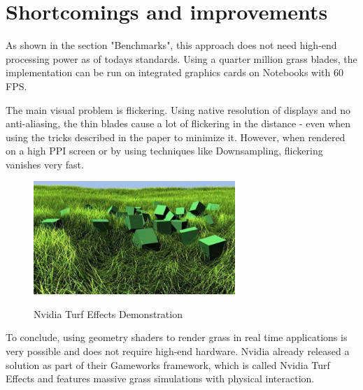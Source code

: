 \documentclass[conference]{acmsiggraph}
\begin{document}
\section{Shortcomings and improvements}

As shown in the section "Benchmarks", this approach does not need high-end processing power as of todays standards. Using a quarter million grass blades, the implementation can be run on integrated graphics cards on Notebooks with 60 FPS.

The main visual problem is flickering. Using native resolution of displays and no anti-aliasing, the thin blades cause a lot of flickering in the distance - even when using the tricks described in the paper to minimize it. However, when rendered on a high PPI screen or by using techniques like Downsampling, flickering vanishes very fast.

 \begin{figure}[ht]
   \centering
   \includegraphics[width=3.0in]{images/turf_effects}
   \caption{Nvidia Turf Effects Demonstration} \cite{NvidiaTurfEffects}
 \end{figure}    

To conclude, using geometry shaders to render grass in real time applications is very possible and does not require high-end hardware. Nvidia already released a solution as part of their Gameworks framework, which is called Nvidia Turf Effects and features massive grass simulations with physical interaction.



\end{document}
